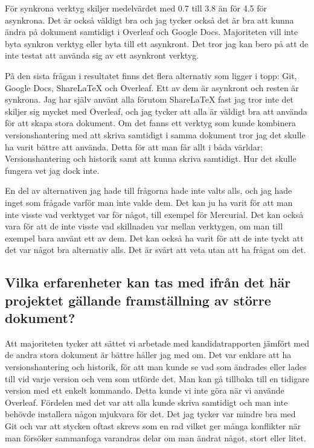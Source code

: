 För synkrona verktyg skiljer medelvärdet med 0.7 till 3.8 än för 4.5 för asynkrona. Det är också väldigt bra och jag tycker också det är bra att kunna ändra på dokument samtidigt i Overleaf och Google Docs. Majoriteten vill inte byta synkron verktyg eller byta till ett asynkront. Det tror jag kan bero på att de inte testat att använda sig av ett asynkront verktyg.

På den sista frågan i resultatet finns det flera alternativ som ligger i topp: Git, Google Docs, ShareLaTeX och Overleaf. Ett av dem är asynkront och resten är synkrona. Jag har själv använt alla förutom ShareLaTeX fast jag tror inte det skiljer sig mycket med Overleaf, och jag tycker att alla är väldigt bra att använda för att skapa stora dokument. Om det fanns ett verktyg som kunde kombinera versionshantering med att skriva samtidigt i samma dokument tror jag det skulle ha varit bättre att använda. Detta för att man får allt i båda världar: Versionshantering och historik samt att kunna skriva samtidigt. Hur det skulle fungera vet jag dock inte.

En del av alternativen jag hade till frågorna hade inte valts alls, och jag hade inget som frågade varför man inte valde dem. Det kan ju ha varit för att man inte visste vad verktyget var för något, till exempel för Mercurial. Det kan också vara för att de inte visste vad skillnaden var mellan verktygen, om man till exempel bara använt ett av dem. Det kan också ha varit för att de inte tyckt att det var något bra alternativ alls. Det är svårt att veta utan att ha frågat om det. 

\subsection{Vilka erfarenheter kan tas med ifrån det här projektet gällande framställning av större dokument?}
Att majoriteten tycker att sättet vi arbetade med kandidatrapporten jämfört med de andra stora dokument är bättre håller jag med om. Det var enklare att ha versionshantering och historik, för att man kunde se vad som ändrades eller lades till vid varje version och vem som utförde det. Man kan gå tillbaka till en tidigare version med ett enkelt kommando. Detta kunde vi inte göra när vi använde Overleaf. Fördelen med det var att alla kunde skriva samtidigt och man inte behövde installera någon mjukvara för det. Det jag tycker var mindre bra med Git och \latex var att stycken oftast skrevs som en rad vilket ger många konflikter när man försöker sammanfoga varandras delar om man ändrat något, stort eller litet.

